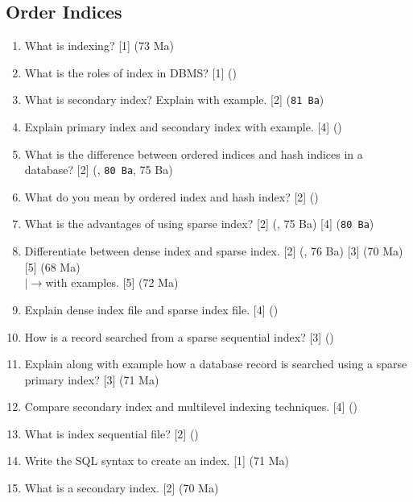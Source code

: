 \documentclass[12pt]{article}
\newcommand{\lb}{\\$\left|\rightarrow\right.$}
\begin{document}
    \subsection{Order Indices}
    		\begin{enumerate}[noitemsep, topsep = 0pt]    			
			\item What is indexing? \hfill [1] (73 Ma)			
    			
    			\item What is the roles of index in DBMS? \hfill [1] ()
    			
    			\item What is secondary index? Explain with example. \hfill [2] (\texttt{81 Ba})
    			
    			\item Explain primary index and secondary index with example. \hfill [4] ()
    			
    			\item What is the difference between ordered indices and hash indices in a database? \hfill [2] (, \texttt{80 Ba}, 75 Ba)
			
			\item What do you mean by ordered index and hash index? \hfill [2] ()    			
    			
    			\item What is the advantages of using sparse index? \hfill [2] (, 75 Ba) [4] (\texttt{80 Ba})
    			
    			\item Differentiate between dense index and sparse index. \hfill [2] (, 76 Ba) [3] (70 Ma) [5] (68 Ma)
    			\lb with examples. \hfill [5] (72 Ma)
    			
    			\item Explain dense index file and sparse index file. \hfill [4] ()
    			
    			\item How is a record searched from a sparse sequential index? \hfill [3] ()
    			
    			\item Explain along with example how a database record is searched using a sparse primary index? \hfill [3] (71 Ma)
    			
    			\item Compare secondary index and multilevel indexing techniques. \hfill [4] ()
    			
    			\item What is index sequential file? \hfill [2] ()
    			
    			\item Write the SQL syntax to create an index. \hfill [1] (71 Ma)
    			\item What is a secondary index. \hfill [2] (70 Ma)
    		\end{enumerate}
    		
\end{document}
